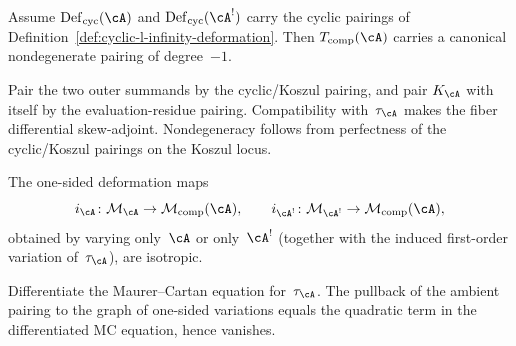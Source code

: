 \begin{conjecture}
\label{lem:ambient-self-duality}
Assume $\mathrm{Def}_{\mathrm{cyc}}(\cA)$ and
$\mathrm{Def}_{\mathrm{cyc}}(\cA^!)$ carry the cyclic
pairings of
Definition~\textup{\ref{def:cyclic-l-infinity-deformation}}.
Then $T_{\mathrm{comp}}(\cA)$ carries a canonical
nondegenerate pairing of degree~$-1$.
\end{conjecture}

\begin{evidence}[Evidence]
Pair the two outer summands by the cyclic/Koszul pairing,
and pair $K_\cA$ with itself by the evaluation-residue
pairing.  Compatibility with~$\tau_\cA$ makes the fiber
differential skew-adjoint.  Nondegeneracy follows from
perfectness of the cyclic/Koszul pairings on the Koszul
locus.
\end{evidence}

\begin{conjecture}
\label{lem:one-sided-isotropy}
The one-sided deformation maps
\[
i_\cA \colon \mathcal{M}_\cA \to \mathcal{M}_{\mathrm{comp}}(\cA),
\qquad
i_{\cA^!} \colon \mathcal{M}_{\cA^!}
  \to \mathcal{M}_{\mathrm{comp}}(\cA),
\]
obtained by varying only~$\cA$ or only~$\cA^!$ (together
with the induced first-order variation of~$\tau_\cA$), are
isotropic.
\end{conjecture}

\begin{evidence}[Evidence]
Differentiate the Maurer--Cartan equation for~$\tau_\cA$.
The pullback of the ambient pairing to the graph of
one-sided variations equals the quadratic term in the
differentiated MC equation, hence vanishes.
\end{evidence}

